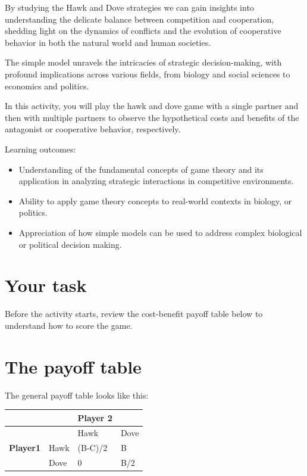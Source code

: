 \documentclass[
  a4paper]{book}
\providecommand{\tightlist}{%
  \setlength{\itemsep}{0pt}\setlength{\parskip}{0pt}}
\begin{document}
By studying the Hawk and Dove strategies we can gain insights into understanding the delicate balance between competition and cooperation, shedding light on the dynamics of conflicts and the evolution of cooperative behavior in both the natural world and human societies.

The simple model unravels the intricacies of strategic decision-making, with profound implications across various fields, from biology and social sciences to economics and politics.

In this activity, you will play the hawk and dove game with a single partner and then with multiple partners to observe the hypothetical costs and benefits of the antagonist or cooperative behavior, respectively.

\begin{do-something}
Learning outcomes:

\begin{itemize}
\tightlist
\item
  Understanding of the fundamental concepts of game theory and its
  application in analyzing strategic interactions in competitive
  environments.
\item
  Ability to apply game theory concepts to real-world contexts in
  biology, or politics.
\item
  Appreciation of how simple models can be used to address complex
  biological or political decision making.
\end{itemize}
\end{do-something}

\section{Your task}\label{your-task-17}

Before the activity starts, review the cost-benefit payoff table below to understand how to score the game.

\section{The payoff table}\label{the-payoff-table}

The general payoff table looks like this:

\begin{longtable}[]{@{}llll@{}}
\toprule\noalign{}
& & Player 2 & \\
\midrule\noalign{}
\endhead
\bottomrule\noalign{}
\endlastfoot
& & Hawk & Dove \\
\textbf{Player1} & Hawk & (B-C)/2 & B \\
& Dove & 0 & B/2 \\
\end{longtable}
\end{document}
